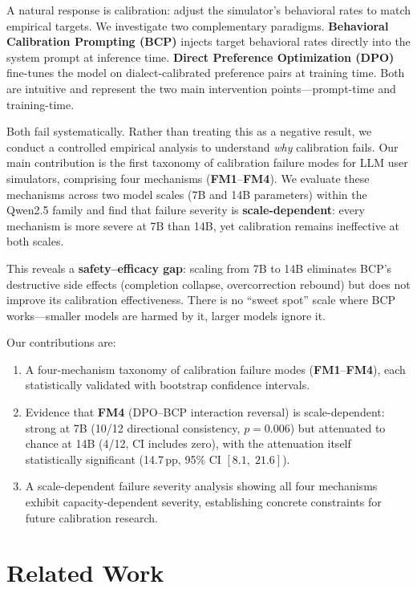 \documentclass[11pt,a4paper]{article}
\newcommand{\fm}[1]{\textbf{FM#1}}
\newcommand{\pp}{\,pp}
\newcommand{\ci}[2]{[#1,\;#2]}
\begin{document}
A natural response is calibration: adjust the simulator's behavioral rates to match empirical targets.
We investigate two complementary paradigms.
\textbf{Behavioral Calibration Prompting (BCP)} injects target behavioral rates directly into the system prompt at inference time.
\textbf{Direct Preference Optimization (DPO)} \citep{rafailov2023dpo} fine-tunes the model on dialect-calibrated preference pairs at training time.
Both are intuitive and represent the two main intervention points---prompt-time and training-time.

Both fail systematically.
Rather than treating this as a negative result, we conduct a controlled empirical analysis to understand \emph{why} calibration fails.
Our main contribution is the first taxonomy of calibration failure modes for LLM user simulators, comprising four mechanisms (\fm{1}--\fm{4}).
We evaluate these mechanisms across two model scales (7B and 14B parameters) within the Qwen2.5 family and find that failure severity is \textbf{scale-dependent}: every mechanism is more severe at 7B than 14B, yet calibration remains ineffective at both scales.

This reveals a \textbf{safety--efficacy gap}: scaling from 7B to 14B eliminates BCP's destructive side effects (completion collapse, overcorrection rebound) but does not improve its calibration effectiveness.
There is no ``sweet spot'' scale where BCP works---smaller models are harmed by it, larger models ignore it.

Our contributions are:
\begin{enumerate}[nosep]
    \item A four-mechanism taxonomy of calibration failure modes (\fm{1}--\fm{4}), each statistically validated with bootstrap confidence intervals.
    \item Evidence that \fm{4} (DPO--BCP interaction reversal) is scale-dependent: strong at 7B (10/12 directional consistency, $p=0.006$) but attenuated to chance at 14B (4/12, CI includes zero), with the attenuation itself statistically significant (14.7\pp, 95\% CI $\ci{8.1}{21.6}$).
    \item A scale-dependent failure severity analysis showing all four mechanisms exhibit capacity-dependent severity, establishing concrete constraints for future calibration research.
\end{enumerate}

\section{Related Work}
\label{sec:related}
\end{document}

